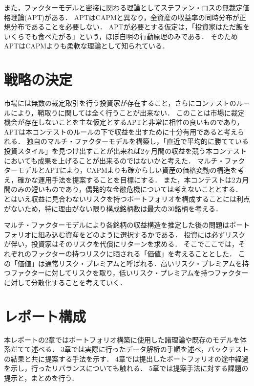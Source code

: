 ﻿\documentclass[11pt]{jreport}
\begin{document}
また，ファクターモデルと密接に関わる理論としてステファン・ロスの無裁定価格理論(APT)\cite{Ross}がある．
APTはCAPMと異なり，全資産の収益率の同時分布が正規分布であることを必要しない．
APTが必要とする仮定は，「投資家はただ飯をいくらでも食べたがる」という，ほぼ自明の行動原理のみである\cite{analyst}．
そのためAPTはCAPMよりも柔軟な理論として知られている．

\section{戦略の決定}

市場には無数の裁定取引を行う投資家が存在すること，さらにコンテストのルールにより，鞘取りに関しては全く行うことが出来ない．
このことは市場に裁定機会が存在しないことを主な仮定とするAPTと非常に相性の良いものであり，APTは本コンテストのルールの下で収益を出すために十分有用であると考えられる．
独自のマルチ・ファクターモデルを構築し，「直近で平均的に勝てている投資スタイル」を見つけ出すことが出来れば2ヶ月間の収益を競う本コンテストにおいても成果を上げることが出来るのではないかと考えた．
マルチ・ファクターモデルとAPTにより，CAPMよりも確からしい資産の価格変動の構造を考え，確かな運用手法を提案することを目標にする．
また，本コンテストは2カ月間のみの短いものであり，偶発的な金融危機については考えないこととする．
とはいえ収益に見合わないリスクを持つポートフォリオを構成することには利点がないため，特に理由がない限り構成銘柄数は最大の30銘柄を考える．

マルチ・ファクターモデルにより各銘柄の収益構造を推定した後の問題はポートフォリオに組み込む資産をどのように選択するかである．
投資には必ずリスクが伴い，投資家はそのリスクを代償にリターンを求める．
そこでここでは，それぞれのファクターの持つリスクに晒される「価値」を考えることとした．
この「価値」は通常リスク・プレミアムと呼ばれる．高いリスク・プレミアムを持つファクターに対してリスクを取り，低いリスク・プレミアムを持つファクターに対して分散化することを考えていく．

\section{レポート構成}
本レポートの2章ではポートフォリオ構築に使用した諸理論や既存のモデルを体系だてて述べる．
3章では実際に行ったデータ解析の手順を述べ，バックテストの結果と共に提案する手法を示す．
4章では提出したポートフォリオの途中経過を示し，行ったリバランスについても触れる．
5章では提案手法に対する課題の提示と，まとめを行う．
\end{document}
